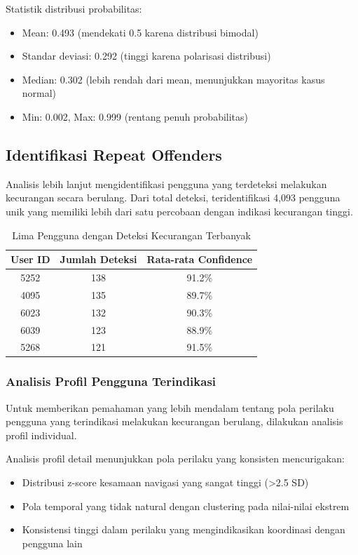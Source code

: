 Statistik distribusi probabilitas:
\begin{itemize}
    \item Mean: 0.493 (mendekati 0.5 karena distribusi bimodal)
    \item Standar deviasi: 0.292 (tinggi karena polarisasi distribusi)
    \item Median: 0.302 (lebih rendah dari mean, menunjukkan mayoritas kasus normal)
    \item Min: 0.002, Max: 0.999 (rentang penuh probabilitas)
\end{itemize}

\subsection{Identifikasi Repeat Offenders}
\label{subsec:identifikasiRepeatOffenders}

Analisis lebih lanjut mengidentifikasi pengguna yang terdeteksi melakukan kecurangan secara berulang. Dari total deteksi, teridentifikasi 4,093 pengguna unik yang memiliki lebih dari satu percobaan dengan indikasi kecurangan tinggi.

\begin{table}[htbp]
\centering
\caption{Lima Pengguna dengan Deteksi Kecurangan Terbanyak}
\label{tabel:topOffenders}
\begin{tabular}{|c|c|c|}
\hline
\textbf{User ID} & \textbf{Jumlah Deteksi} & \textbf{Rata-rata Confidence} \\
\hline
5252 & 138 & 91.2\% \\
\hline
4095 & 135 & 89.7\% \\
\hline
6023 & 132 & 90.3\% \\
\hline
6039 & 123 & 88.9\% \\
\hline
5268 & 121 & 91.5\% \\
\hline
\end{tabular}
\end{table}

\subsubsection{Analisis Profil Pengguna Terindikasi}

Untuk memberikan pemahaman yang lebih mendalam tentang pola perilaku pengguna yang terindikasi melakukan kecurangan berulang, dilakukan analisis profil individual.

Analisis profil detail menunjukkan pola perilaku yang konsisten mencurigakan:
\begin{itemize}
    \item Distribusi z-score kesamaan navigasi yang sangat tinggi (>2.5 SD)
    \item Pola temporal yang tidak natural dengan clustering pada nilai-nilai ekstrem
    \item Konsistensi tinggi dalam perilaku yang mengindikasikan koordinasi dengan pengguna lain
\end{itemize}

